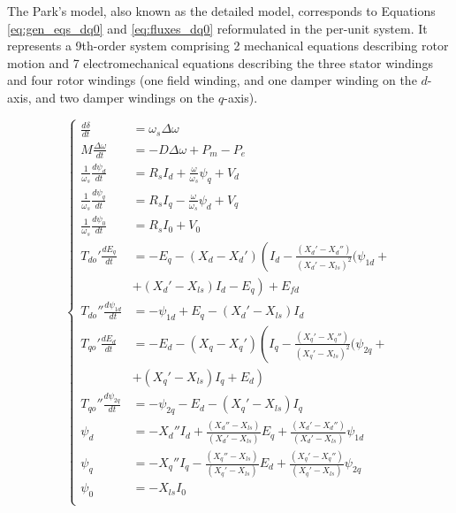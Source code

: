 The Park's model, also known as the detailed model, corresponds to Equations
\ref{eq:gen_eqs_dq0} and \ref{eq:fluxes_dq0} reformulated in the per-unit
system. It represents a 9th-order system comprising 2 mechanical equations
describing rotor motion and 7 electromechanical equations describing the three
stator windings and four rotor windings (one field winding, and one damper
winding on the $d$-axis, and two damper windings on the $q$-axis).

\begin{equation}\label{eq:sg_park}
    \begin{cases}
        \frac{d\delta}{dt} &= \omega_s \Delta\omega\\
        M\frac{\Delta\omega}{dt} &= -D\Delta\omega + P_m - P_e\\
        \frac{1}{\omega_s} \frac{d\psi_d}{dt} &= R_s I_d + \frac{\omega}{\omega_s}\psi_q + V_d\\
        \frac{1}{\omega_s} \frac{d\psi_q}{dt} &= R_s I_q - \frac{\omega}{\omega_s}\psi_d + V_q\\
        \frac{1}{\omega_s} \frac{d\psi_0}{dt} &= R_s I_0 + V_0\\
        T_{do}'\frac{dE_q}{dt} &= -E_q - (X_d - X_d')\left(I_d - \frac{(X_d' - X_d'')}{(X_d' - X_{ls})^2}(\psi_{1d} +\right.\\
                               &+ \left. (X_d' - X_{ls})I_d - E_q\right) + E_{fd}\\
        T_{do}''\frac{d\psi_{1d}}{dt} &= -\psi_{1d} + E_q - (X_d' - X_{ls}) I_d\\
        T_{qo}'\frac{dE_d}{dt} &= -E_d - (X_q - X_q')\left(I_q - \frac{(X_q' - X_q'')}{(X_q' - X_{ls})^2}(\psi_{2q} +\right.\\
                               &+ \left. (X_q' - X_{ls})I_q + E_d\right)\\
        T_{qo}''\frac{d\psi_{2q}}{dt} &= -\psi_{2q} - E_d - (X_q' - X_{ls}) I_q\\
        \psi_d &= -X_d'' I_d + \frac{(X_d'' - X_{ls})}{(X_d' - X_{ls})} E_q + \frac{(X_d' - X_d'')}{(X_d' - X_{ls})}\psi_{1d}\\
        \psi_q &= -X_q'' I_q - \frac{(X_q'' - X_{ls})}{(X_q' - X_{ls})} E_d + \frac{(X_q' - X_q'')}{(X_q' - X_{ls})}\psi_{2q}\\
        \psi_0 &= -X_{ls} I_0\\
    \end{cases}
\end{equation}


